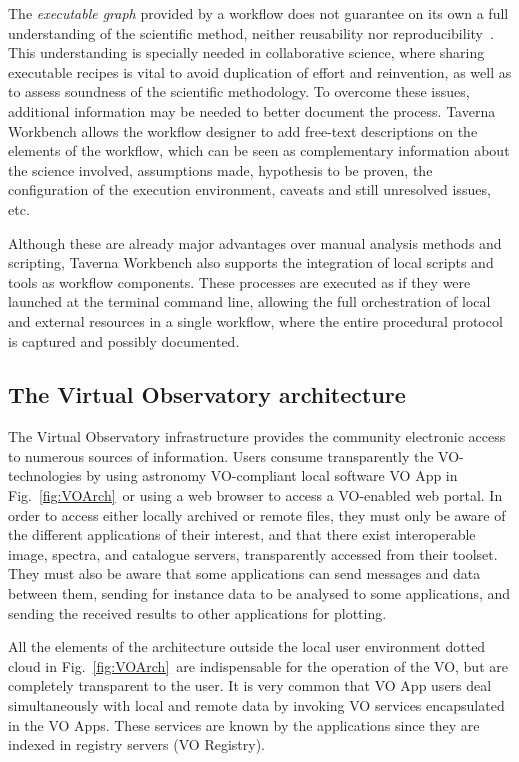 \documentclass[final,authoryear,5p,times,twocolumn]{elsarticle}
\begin{document}
The \textit{executable graph} provided by a workflow does not guarantee on its own a full understanding of the scientific method, neither reusability nor reproducibility~\citep{WfRO:SePublica2012}. This understanding is specially needed in collaborative science, where sharing executable recipes is vital to avoid duplication of effort and reinvention, as well as to assess soundness of the scientific methodology. To overcome these issues, additional information may be needed to better document the process. Taverna Workbench allows the workflow designer to add free-text descriptions on the elements of the workflow, which can be seen as complementary information about the science involved, assumptions made, hypothesis to be proven, the configuration of the execution environment, caveats and still unresolved issues, etc.

Although these are already major advantages over manual analysis methods and scripting, Taverna Workbench also supports the integration of local scripts and tools as workflow components. These processes are executed as if they were launched at the terminal command line, allowing the full orchestration of local and external resources in a single workflow, where the entire procedural protocol is captured and possibly documented. 

\subsection{The Virtual Observatory architecture}
\label{VirtualObservatory}

The Virtual Observatory infrastructure provides the community electronic access to numerous sources of information.  Users consume transparently the VO-technologies by using astronomy VO-compliant local software \textendash VO App in Fig.~\ref{fig:VOArch}\textendash\ or using a web browser to access a VO-enabled web portal. In order to access either locally archived or remote files, they must only be aware of the different applications of their interest, and that there exist interoperable image, spectra, and catalogue servers, transparently accessed from their toolset. They must also be aware that some applications can send messages and data between them, sending for instance data to be analysed to some applications, and sending the received results to other applications for plotting. 

All the elements of the architecture outside the local user environment \textendash dotted cloud in Fig.~\ref{fig:VOArch}\textendash\ are indispensable for the operation of the VO, but are completely transparent to the user. It is very common that VO App users deal simultaneously with local and remote data by invoking VO services encapsulated in the VO Apps. These services are known by the applications since they are indexed in registry servers (VO Registry).
\end{document}
